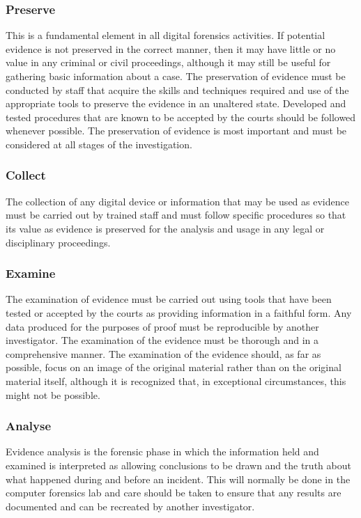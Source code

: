 \subsubsection{Preserve}
This is a fundamental element in all digital forensics activities. If potential evidence is not preserved in the correct manner, then it may have little or no value in any criminal or civil proceedings, although it may still be useful for gathering basic information about a case. The preservation of evidence must be conducted by staff that acquire the skills and techniques required and use of the appropriate tools to preserve the evidence in an unaltered state. Developed and tested procedures that are known to be accepted by the courts should be followed whenever possible. The preservation of evidence is most important and must be considered at all stages of the investigation.
\subsubsection{Collect}
The collection of any digital device or information that may be used as evidence must be carried out by trained staff and must follow specific procedures so that its value as evidence is preserved for the analysis and usage in any legal or disciplinary proceedings.
\subsubsection{Examine}
The examination of evidence must be carried out using tools that have been tested or accepted by the courts as providing information in a faithful form. Any data produced for the purposes of proof must be reproducible by another investigator. The examination of the evidence must be thorough and in a comprehensive manner. The examination of the evidence should, as far as possible, focus on an image of the original material rather than on the original material itself, although it is recognized that, in exceptional circumstances, this might not be possible.
\subsubsection{Analyse}
Evidence analysis is the forensic phase in which the information held and examined is interpreted as allowing conclusions to be drawn and the truth about what happened during and before an incident. This will normally be done in the computer forensics lab and care should be taken to ensure that any results are documented and can be recreated by another investigator.
